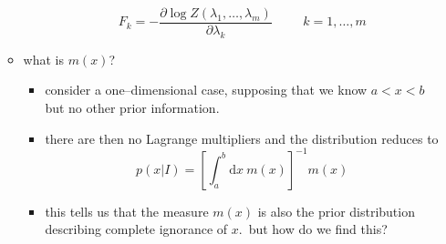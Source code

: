 \documentclass[../jaynes_prob_theory_notes.tex]{subfiles}
\begin{document}
\begin{itemize}
\begin{itemize}
\begin{itemize}
                                    \begin{equation*} 
                                        F_k = - \frac{\partial \log Z(\lambda_1, \ldots, \lambda_m)}{\partial \lambda_k} \hspace{1cm} k = 1, \ldots, m
                                    \end{equation*}
                            \end{itemize}
                        \item what is \( m(x) \)?
                            \begin{itemize} 
                                \item consider a one--dimensional case, supposing that we know \( a < x < b\) but no other prior information.
                                \item there are then no Lagrange multipliers and the distribution reduces to
                                    \begin{equation*} 
                                        p(x|I) = {\left[ \int^{b}_{a} \mathrm{d}x~m(x) \right]}^{-1} m(x)
                                    \end{equation*}
                                \item this tells us that the measure \( m(x) \) is also the prior distribution describing complete ignorance of \( x \).\ but how do we find this?
                            \end{itemize}
                    \end{itemize}
            \end{itemize}
\end{document}
